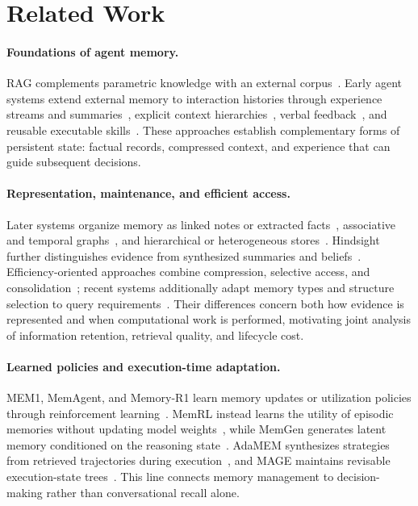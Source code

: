 \section{Related Work}
\label{sec:related_work_20260903}

\paragraph{Foundations of agent memory.}
RAG complements parametric knowledge with an external corpus~\citep{mrw_rag}. Early agent systems extend external memory to interaction histories through experience streams and summaries~\citep{mrw_generative_agents,mrw_memorybank}, explicit context hierarchies~\citep{mrw_memgpt}, verbal feedback~\citep{mrw_reflexion}, and reusable executable skills~\citep{mrw_voyager}. These approaches establish complementary forms of persistent state: factual records, compressed context, and experience that can guide subsequent decisions.

\paragraph{Representation, maintenance, and efficient access.}
Later systems organize memory as linked notes or extracted facts~\citep{mrw_amem,mrw_mem0}, associative and temporal graphs~\citep{mrw_hipporag,mrw_hipporag2,mrw_zep,mrw_magma}, and hierarchical or heterogeneous stores~\citep{mrw_memtree,mrw_memoryos,mrw_memos}. Hindsight further distinguishes evidence from synthesized summaries and beliefs~\citep{mrw_hindsight}. Efficiency-oriented approaches combine compression, selective access, and consolidation~\citep{mrw_readagent,mrw_lightmem,mrw_simplemem}; recent systems additionally adapt memory types and structure selection to query requirements~\citep{mrw_leanmem,mrw_mesa}. Their differences concern both how evidence is represented and when computational work is performed, motivating joint analysis of information retention, retrieval quality, and lifecycle cost.

\paragraph{Learned policies and execution-time adaptation.}
MEM1, MemAgent, and Memory-R1 learn memory updates or utilization policies through reinforcement learning~\citep{mrw_mem1,mrw_memagent,mrw_memory_r1}. MemRL instead learns the utility of episodic memories without updating model weights~\citep{mrw_memrl}, while MemGen generates latent memory conditioned on the reasoning state~\citep{mrw_memgen}. AdaMEM synthesizes strategies from retrieved trajectories during execution~\citep{mrw_adamem}, and MAGE maintains revisable execution-state trees~\citep{mrw_execution_state}. This line connects memory management to decision-making rather than conversational recall alone.

